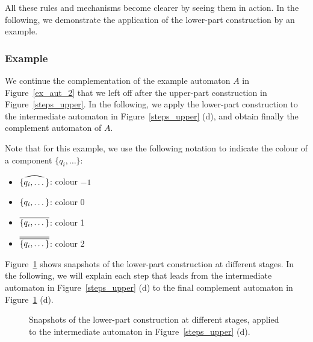 All these rules and mechanisms become clearer by seeing them in action. In the following, we demonstrate the application of the lower-part construction by an example.

\subsubsection{Example}
We continue the complementation of the example automaton $A$ in Figure~\ref{ex_aut_2} that we left off after the upper-part construction in Figure~\ref{steps_upper}. In the following, we apply the lower-part construction to the intermediate automaton in Figure~\ref{steps_upper} (d), and obtain finally the complement automaton of $A$.

Note that for this example, we use the following notation to indicate the colour of a component $\{q_i, \dots \}$:
\begin{itemize}
\item $\cl^{\{q_i, \dots \}}$: colour $-1$
\item $\cl0{\{q_i, \dots \}}$: colour 0   %
\item $\cl1{\{q_i, \dots \}}$: colour 1   %
\item $\cl2{\{q_i, \dots \}}$: colour 2
\end{itemize}

Figure~\ref{steps_lower} shows snapshots of the lower-part construction at different stages. In the following, we will explain each step that leads from the intermediate automaton in Figure~\ref{steps_upper} (d) to the final complement automaton in Figure~\ref{steps_lower} (d).

\begin{figure}[htb]
\centering
  \begin{subfigure}[t]{0.49\textwidth}
  \centering
  \ComplementA
  \caption{}
  \end{subfigure}
  \hfill
  \begin{subfigure}[t]{0.49\textwidth}
  \centering
  \ComplementB
  \caption{}
  \end{subfigure}

  \begin{subfigure}[t]{0.49\textwidth}
  \centering
  \ComplementC
  \caption{}
  \end{subfigure}
  \hfill
  \begin{subfigure}[t]{0.49\textwidth}
  \centering
  \ComplementD
  \caption{}
  \end{subfigure}
\caption{Snapshots of the lower-part construction at different stages, applied to the intermediate automaton in Figure~\ref{steps_upper} (d).}
\label{steps_lower}
\end{figure}


